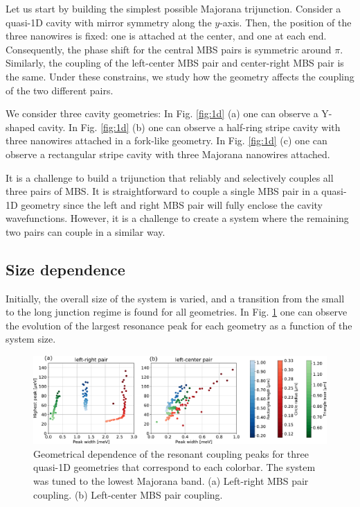Let us start by building the simplest possible Majorana trijunction.
Consider a quasi-1D cavity with mirror symmetry along the $y$-axis.
Then, the position of the three nanowires is fixed: one is attached at the center, and one at each end.
Consequently, the phase shift for the central MBS pairs is symmetric around $\pi$.
Similarly, the coupling of the left-center MBS pair and center-right MBS pair is the same.
Under these constrains, we study how the geometry affects the coupling of the two different pairs.

We consider three cavity geometries:
In Fig. \ref{fig:1d} (a) one can observe a Y-shaped cavity. 
In Fig. \ref{fig:1d} (b) one can observe a half-ring stripe cavity with three nanowires attached in a fork-like geometry. 
In Fig. \ref{fig:1d} (c) one can observe a rectangular stripe cavity with three Majorana nanowires attached.

It is a challenge to build a trijunction that reliably and selectively couples all three pairs of MBS.
It is straightforward to couple a single MBS pair in a quasi-1D geometry since the left and right MBS pair will fully enclose the cavity wavefunctions.
However, it is a challenge to create a system where the remaining two pairs can couple in a similar way.

\subsection{Size dependence}

Initially, the overall size of the system is varied, and a transition from the small to the long junction regime is found for all geometries.
In Fig. \ref{fig:1d_results} one can observe the evolution of the largest resonance peak for each geometry as a function of the system size.

\begin{figure}[h!]
\centering
  \includegraphics[width=\linewidth]{figures/couplings_1d.pdf}
  \caption{Geometrical dependence of the resonant coupling peaks for three quasi-1D geometries that correspond to each colorbar. The system was tuned to the lowest Majorana band. (a) Left-right MBS pair coupling. (b) Left-center MBS pair coupling.}
  \label{fig:1d_results}
\end{figure}

